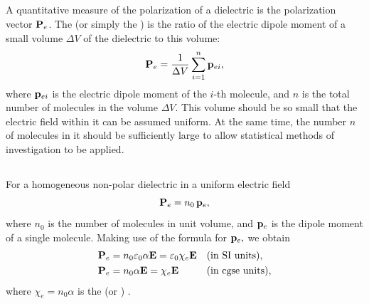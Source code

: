 \subsection{}\label{18.2.3} A quantitative measure of the polarization of a dielectric is the polarization vector $\vb{P}_{e}$. The  (or simply the ) is the ratio of the electric dipole moment of a small volume $\Delta V$ of the dielectric to this volume:
\begin{equation*}%
\vb{P}_{e} = \frac{1}{\Delta V} \sum_{i = 1}^{n} \vb{p}_{ei},
\end{equation*}
where $\vb{p}_{ei}$ is the electric dipole moment of the $i$-th molecule, and $n$ is the total number of molecules in the volume $\Delta V$. This volume should be so small that the electric field  within it can be assumed uniform. At the same time, the number $n$ of molecules in it should be sufficiently large to allow statistical methods of investigation  to be applied.

\subsection{}\label{18.2.4} For a homogeneous non-polar dielectric  in a uniform electric field
\begin{equation*}%
\vb{P}_{e} = n_{0} \, \vb{p}_{e},
\end{equation*}
where $n_{0}$ is the number of molecules in unit volume, and $\vb{p}_{e}$ is the dipole moment of a single molecule. Making use of the
formula for $\vb{p}_{e},$  we obtain
\begin{align*}
\vb{P}_{e} & = n_{0} \varepsilon_{0} \alpha \vb{E} =  \varepsilon_{0} \chi_{e} \vb{E} && \text{(in SI units),} \\
\vb{P}_{e} & = n_{0} \alpha \vb{E} = \chi_{e} \vb{E} && \text{(in cgse units),}
\end{align*}
where $\chi_{e} = n_{0} \alpha$ is the  (or ) .


